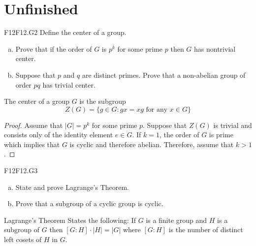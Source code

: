 \documentclass[../AlgebraQualSolutions.tex]{subfiles}
\begin{document}
\section{Unfinished}
	
	\begin{prob}{F12}{F12.G2}
	Define the center of a group.
	\begin{enumerate}[(a)]
	\item Prove that if the order of $G$ is $p^k$ for some prime $p$ then $G$ has nontrivial center.
	\item Suppose that $p$ and $q$ are distinct primes. Prove that a non-abelian group of order $pq$ has trivial center.
	\end{enumerate}
	\end{prob}
	
	The center of a group $G$ is the subgroup
		\[Z(G) = \{g \in G: gx = xg \textrm{ for any $x \in G$} \} \]
	
	\begin{proof}
	Assume that $|G| = p^k$ for some prime $p$. Suppose that $Z(G)$ is trivial and consists only of the identity element $e \in G$. If $k = 1$, the order of $G$ is prime which implies that $G$ is cyclic and therefore abelian. Therefore, assume that $k > 1$.
	\end{proof}
	
	
	\begin{prob}{F12}{F12.G3}
	\begin{enumerate}[(a)]
	\item State and prove Lagrange's Theorem.
	\item Prove that a subgroup of a cyclic group is cyclic.
	\end{enumerate}
	\end{prob}
	
	Lagrange's Theorem States the following: If $G$ is a finite group and $H$ is a subgroup of $G$ then $[G:H]\cdot|H| = |G|$ where $[G:H]$ is the number of distinct left cosets of $H$ in $G$.
\end{document}
